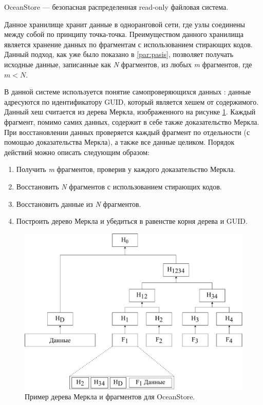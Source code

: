 OceanStore \cite{ocean} --- безопасная распределенная read-only файловая система.

Данное хранилище хранит данные в одноранговой сети, где узлы соединены между собой по принципу точка-точка. Преимуществом данного хранилища является хранение данных по фрагментам с использованием стирающих кодов. Данный подход, как уже было показано в \ref{par:pasis}, позволяет получать исходные данные, записанные как \textit{N} фрагментов, из любых \textit{m} фрагментов, где $m < N$.

В данной системе используется понятие самопроверяющихся данных \cite{selfverify}: данные адресуются по идентификатору GUID, который является хешем от содержимого. Данный хеш считается из дерева Меркла, изображенного на рисунке \ref{fig:ocean}. Каждый фрагмент, помимо самих данных, содержит в себе также доказательство Меркла. При восстановлении данных проверяется каждый фрагмент по отдельности (с помощью доказательства Меркла), а также все данные целиком. Порядок действий можно описать следующим образом:
\begin{enumerate}
	\item Получить \textit{m} фрагментов, проверив у каждого доказательство Меркла.
	\item Восстановить \textit{N} фрагментов с использованием стирающих кодов.
	\item Восстановить данные из \textit{N} фрагментов. %
	\item Построить дерево Меркла и убедиться в равенстве корня дерева и GUID.
\end{enumerate}

\begin{figure}[hbtp]
	\centering
	\includegraphics[width=\textwidth]{img/ocean.pdf}
	\caption{Пример дерева Меркла и фрагментов для OceanStore.}
	\label{fig:ocean}
\end{figure}

